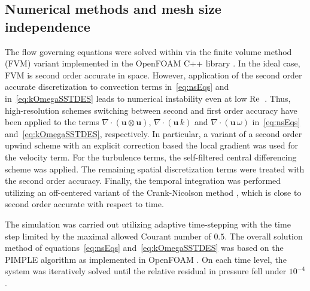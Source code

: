 \subsection{Numerical methods and mesh size independence}
\label{sub:numerics}
The flow governing equations were solved within {via} the finite volume method (FVM) {variant implemented in the OpenFOAM C++ library \citep{OpenFOAM2007}}. In the ideal case, FVM is second order accurate in space. However, application of the second order accurate discretization to convection terms in~\eqref{eq:nsEqs} and in~\eqref{eq:kOmegaSSTDES} leads to numerical instability even at low $\mathrm{Re}$~\citep{moukalled2016}. Thus, {high-resolution} schemes switching between second and first order accuracy have been applied to the terms $\nabla \cdot \left( \bm{u} \otimes \bm{u}\right)$, $\nabla \cdot \left( \bm{u}\, k\right)$ and $\nabla \cdot \left( \bm{u}\, \omega\right)$ in~\eqref{eq:nsEqs} and~\eqref{eq:kOmegaSSTDES}, respectively. In particular, a variant of a second order upwind scheme with an explicit correction based the local gradient was used for the velocity term. For the turbulence terms, the self-filtered central differencing scheme \citep{zhu1991} was applied. The remaining spatial discretization terms were treated with the second order accuracy. Finally, the temporal integration was performed utilizing an off-centered variant of the Crank-Nicolson method \citep{crankNicolson1947}, which is close to second order accurate with respect to time.

The simulation was carried out utilizing adaptive time-stepping with the time step limited by the maximal allowed Courant number of $0.5$. The overall solution method of equations~\eqref{eq:nsEqs} and~\eqref{eq:kOmegaSSTDES} was based on the PIMPLE algorithm as implemented in OpenFOAM \citep{OpenFOAM2007}. On each time level, the system was iteratively solved until the relative residual in pressure fell under $10^{-4}$.

